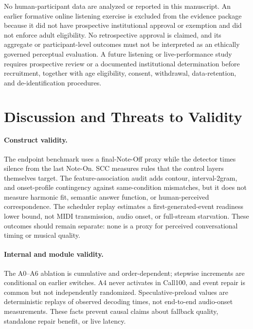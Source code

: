 \documentclass[11pt,a4paper]{article}
\begin{document}
No human-participant data are analyzed or reported in this manuscript. An earlier formative online listening exercise is excluded from the evidence package because it did not have prospective institutional approval or exemption and did not enforce adult eligibility. No retrospective approval is claimed, and its aggregate or participant-level outcomes must not be interpreted as an ethically governed perceptual evaluation. A future listening or live-performance study requires prospective review or a documented institutional determination before recruitment, together with age eligibility, consent, withdrawal, data-retention, and de-identification procedures.

\section{Discussion and Threats to Validity}
\label{subsec:subjective-evaluation-scope}

\paragraph{Construct validity.}
The endpoint benchmark uses a final-Note-Off proxy while the detector times silence from the last Note-On. SCC measures rules that the control layers themselves target. The feature-association audit adds contour, interval-2gram, and onset-profile contingency against same-condition mismatches, but it does not measure harmonic fit, semantic answer function, or human-perceived correspondence. The scheduler replay estimates a first-generated-event readiness lower bound, not MIDI transmission, audio onset, or full-stream starvation. These outcomes should remain separate: none is a proxy for perceived conversational timing or musical quality.

\paragraph{Internal and module validity.}
The A0--A6 ablation is cumulative and order-dependent; stepwise increments are conditional on earlier switches. A4 never activates in Call100, and event repair is common but not independently randomized. Speculative-preload values are deterministic replays of observed decoding times, not end-to-end audio-onset measurements. These facts prevent causal claims about fallback quality, standalone repair benefit, or live latency.
\end{document}
